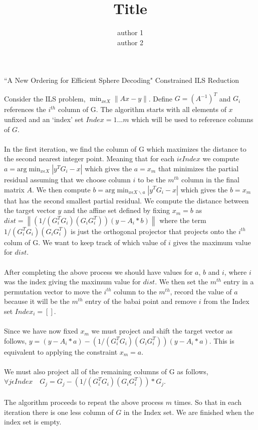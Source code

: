 \documentclass[11pt]{article}	%
\author{author 1\\ author 2}
\title{Title}
\numberwithin{algorithm}{section}
\begin{document}
\begin{center}\begin{large}``A New Ordering for Efficient Sphere Decoding" Constrained ILS Reduction\end{large}\end{center}
Consider the ILS problem, $\min_{x\epsilon X}\left \| Ax-y \right \|$. Define $G=(A^{-1})^T$ and $G_i$ references the $i^{th}$ column of G. The algorithm starts with all elements of $x$ unfixed and an `index' set $Index={1...m}$ which will be used to reference columns of $G$.\\\\

In the first iteration, we find the column of G which maximizes the distance to the second nearest integer point. Meaning that for each $i\epsilon Index$ we compute $a=\textrm{arg}\min_{x\epsilon X}\left | y^TG_i - x \right |$ which gives the $a=x_m$ that minimizes the partial residual assuming that we choose column $i$ to be the $m^{th}$ column in the final matrix $A$. We then compute  $b=\textrm{arg}\min_{x\epsilon X\backslash a}\left | y^TG_i - x \right |$ which gives the $b=x_m$ that has the second smallest partial residual. We compute the distance between the target vector $y$ and the affine set defined by fixing $x_m = b$ as $dist=\left \| ( 1/(G_i^TG_i)(G_iG_i^T))(y - A_i*b) \right \|$ where the term $1/(G_i^TG_i)(G_iG_i^T)$ is just the orthogonal projector that projects onto the $i^{th}$ colum of G. We want to keep track of which value of $i$ gives the maximum value for $dist$.\\\\

After completing the above process we should have values for $a$, $b$ and $i$, where $i$ was the index giving the maximum value for $dist$. We then set the $m^{th}$ entry in a permutation vector to move the $i^{th}$ column to the $m^{th}$, record the value of $a$ because it will be the $m^{th}$ entry of the babai point and remove $i$ from the Index set $Index_i=[]$.\\\\

Since we have now fixed $x_m$ we must project and shift the target vector as follows, $y= (y - A_i*a) - (1/(G_i^TG_i)(G_iG_i^T))(y-A_i*a)$. This is equivalent to applying the constraint $x_m = a$.\\\\

We must also project all of the remaining columns of G as follows, $\forall j\epsilon Index \quad G_j = G_j - (1/(G_i^TG_i)(G_iG_i^T))*G_j$.\\\\

The algorithm proceeds to repeat the above process $m$ times. So that in each iteration there is one less column of $G$ in the Index set. We are finished when the index set is empty.
\end{document}
